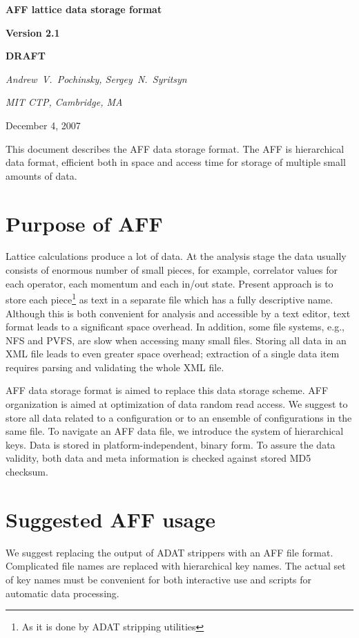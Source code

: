 \documentclass[10pt,letterpaper]{article}
\begin{document}
\centerline{\huge\bf AFF lattice data storage format}
\vspace{15pt}
\centerline{\huge\bf Version 2.1}
\vspace{15pt}
\centerline{\Huge\bf DRAFT}
\vspace{20pt}
\centerline{\it Andrew~V.~Pochinsky, Sergey~N.~Syritsyn}
\centerline{\it MIT CTP, Cambridge, MA}
\vspace{10pt}
\centerline{December 4, 2007}
\vspace{20pt}

\noindent This document describes the AFF data storage format. 
The AFF is hierarchical data format, efficient both in space and access time 
for storage of multiple small amounts of data.

\tableofcontents

\section{Purpose of AFF}
Lattice calculations produce a lot of data. 
At the analysis stage the data usually consists of enormous number of small
pieces, for example, correlator values for
each operator, each momentum and each in/out state.
Present approach is to store each
piece\footnote{As it is done by ADAT stripping utilities}
as text in a separate file which has a fully descriptive name. 
Although this is both convenient for analysis and accessible by a text editor,
text format leads to a significant space overhead. 
In addition, some file systems, e.g., NFS and PVFS, are slow when accessing
many small files. 
Storing all data in an XML file leads to even greater space overhead;
extraction of a single data item requires parsing and validating the
whole XML file.

AFF data storage format is aimed to replace this data storage scheme. 
AFF organization is aimed at optimization of data random read access.
We suggest to store all data related to a configuration or to an ensemble of configurations in
the same file.
To navigate an AFF data file, we introduce the system of hierarchical keys.
Data is stored in platform-independent, binary form.
To assure the data validity, both data and meta information is checked against stored
MD5 checksum.


\section{Suggested AFF usage}

We suggest replacing the output of ADAT strippers with an AFF file format. 
Complicated file names are replaced with hierarchical key names. 
The actual set of key names must be convenient for both interactive use and 
scripts for automatic data processing.
\end{document}
